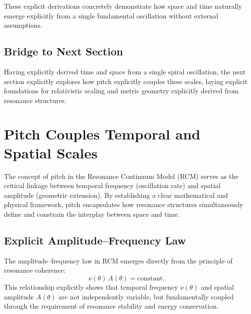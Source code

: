 These explicit derivations concretely demonstrate how space and time naturally emerge explicitly from a single fundamental oscillation without external assumptions.

\subsection{Bridge to Next Section}

Having explicitly derived time and space from a single spiral oscillation, the next section explicitly explores how pitch explicitly couples these scales, laying explicit foundations for relativistic scaling and metric geometry explicitly derived from resonance structures.


\section{Pitch Couples Temporal and Spatial Scales}


The concept of pitch in the Resonance Continuum Model (RCM) serves as the critical linkage between temporal frequency (oscillation rate) and spatial amplitude (geometric extension). By establishing a clear mathematical and physical framework, pitch encapsulates how resonance structures simultaneously define and constrain the interplay between space and time.

\subsection{Explicit Amplitude–Frequency Law}
\label{sec:amplitude-frequency-law}

The amplitude–frequency law in RCM emerges directly from the principle of resonance coherence:
\begin{equation}
  \nu(\theta)\,A(\theta) = \text{constant}.
\end{equation}
This relationship explicitly shows that temporal frequency $\nu(\theta)$ and spatial amplitude $A(\theta)$ are not independently variable, but fundamentally coupled through the requirement of resonance stability and energy conservation.

